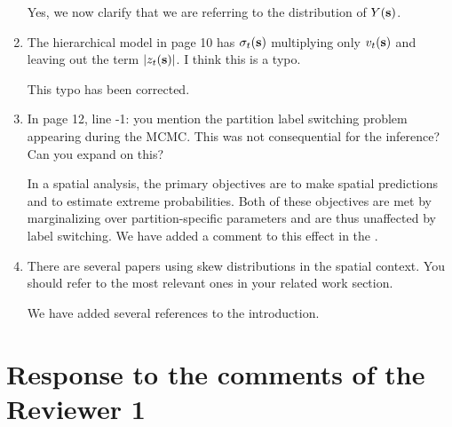 \documentclass[11pt]{article}
\begin{document}
\begin{enumerate}[1.]
  \begin{response}
    Yes, we now clarify that we are referring to the distribution of $Y(\mbox{\bf s})$.
  \end{response}

  \item The hierarchical model in page 10 has $\sigma_t(\mbox{\bf s})$ multiplying only $v_t(\mbox{\bf s})$ and leaving out the term $|z_t(\mbox{\bf s})|$. I think this is a typo. \\

  \begin{response}
    This typo has been corrected.
  \end{response}

  \item In page 12, line -1: you mention the partition label switching problem appearing during the MCMC. This was not consequential for the inference? Can you expand on this? \\

  \begin{response}
    In a spatial analysis, the primary objectives are to make spatial predictions and to estimate extreme probabilities.
    Both of these objectives are met by marginalizing over partition-specific parameters and are thus unaffected by label switching.
    We have added a comment to this effect in the .
  \end{response}

  \item There are several papers using skew distributions in the spatial context. You should refer to the most relevant ones in your related work section. \\

  \begin{response}
    We have added several references to the introduction.
  \end{response}

\end{enumerate}

\newpage
\section*{Response to the comments of the Reviewer 1}
\end{document}
